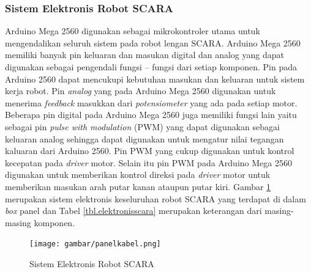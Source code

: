 \subsubsection{Sistem Elektronis Robot SCARA}
Arduino Mega 2560 digunakan sebagai mikrokontroler utama untuk mengendalikan seluruh sistem pada robot lengan SCARA. Arduino Mega 2560 memiliki banyak pin keluaran dan masukan digital dan analog yang dapat digunakan sebagai pengendali fungsi – fungsi dari setiap komponen. Pin pada Arduino  2560 dapat mencukupi kebutuhan masukan dan keluaran untuk sistem kerja robot. Pin \textit{analog} yang pada Arduino Mega 2560 digunakan untuk menerima \textit{feedback} masukkan dari \textit{potensiometer} yang ada pada setiap motor. Beberapa pin digital pada Arduino Mega 2560 juga  memiliki fungsi lain yaitu sebagai pin \textit{pulse with modulation} (PWM) yang dapat digunakan sebagai keluaran analog sehingga dapat digunakan untuk mengatur nilai tegangan kaluaran dari Arduino  2560. Pin PWM yang cukup digunakan untuk kontrol kecepatan pada \textit{driver} motor. Selain itu pin PWM pada Arduino Mega 2560 digunakan untuk memberikan kontrol direksi pada \textit{driver} motor untuk memberikan masukan arah putar kanan ataupun putar kiri. Gambar \ref{pic.boxpanelkabel} merupakan sistem elektronis keseluruhan robot SCARA yang terdapat di dalam \textit{box} panel dan Tabel \ref{tbl.elektronisscara} merupakan keterangan dari masing-masing komponen.
\begin{figure}[H]
	\centering
	\texttt{[image: gambar/panelkabel.png]}
	\caption{Sistem Elektronis Robot SCARA}
	\label{pic.boxpanelkabel}
\end{figure}
